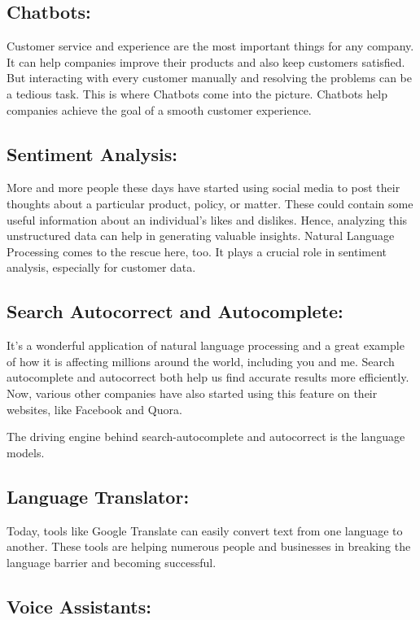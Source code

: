 \subsection{Chatbots:}

Customer service and experience are the most important things for any company. It can help companies improve their products and also keep customers satisfied. But interacting with every customer manually and resolving the problems can be a tedious task. This is where Chatbots come into the picture. Chatbots help companies achieve the goal of a smooth customer experience.
\subsection{Sentiment Analysis:}

More and more people these days have started using social media to post their thoughts about a particular product, policy, or matter. These could contain some useful information about an individual’s likes and dislikes. Hence, analyzing this unstructured data can help in generating valuable insights. Natural Language Processing comes to the rescue here, too. It plays a crucial role in sentiment analysis, especially for customer data.
\subsection{Search Autocorrect and Autocomplete:}

It’s a wonderful application of natural language processing and a great example of how it is affecting millions around the world, including you and me. Search autocomplete and autocorrect both help us find accurate results more efficiently. Now, various other companies have also started using this feature on their websites, like Facebook and Quora.

\noindent The driving engine behind search-autocomplete and autocorrect is the language models. 
\subsection{Language Translator:}

Today, tools like Google Translate can easily convert text from one language to another. These tools are helping numerous people and businesses in breaking the language barrier and becoming successful.
\subsection{Voice Assistants:}

